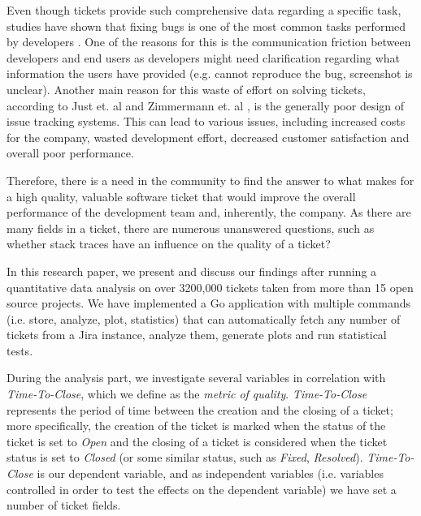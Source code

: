 \documentclass{mpaper}
\begin{document}
Even though tickets provide such comprehensive data regarding a specific task, studies have shown 
that fixing bugs is one of the most common tasks performed by developers \cite{latoza2006maintaining}. One of
the reasons for this is the communication friction between developers and end users \cite{Korkala2014WasteIdentification}
as developers might need clarification regarding what information the users have provided (e.g. cannot reproduce the bug, 
screenshot is unclear). Another main reason for this waste of effort on solving tickets, according to 
Just et. al \cite{just2008towards} and Zimmermann et. al \cite{zimmermann2009improving}, is the generally poor design of issue 
tracking systems. This can lead to various issues, including increased costs for the company, wasted development effort, 
decreased customer satisfaction and overall poor performance.

Therefore, there is a need in the community to find the answer to what makes for a high quality, valuable software ticket 
that would improve the overall performance of the development team and, inherently, the company. As there are many 
fields in a ticket, there are numerous unanswered questions, such as whether stack traces have an influence on the quality
of a ticket? 

In this research paper, we present and discuss our findings after running a quantitative data analysis 
on over 3200,000 tickets taken from more than 15 open source projects. We have implemented a Go application 
with multiple commands (i.e. store, analyze, plot, statistics) that can automatically fetch any number of tickets 
from a Jira instance, analyze them, generate plots and run statistical tests. 

During the analysis part, we investigate several variables in correlation with \emph{Time-To-Close}, 
which we define as the \emph{metric of quality}. \emph{Time-To-Close} represents the period of time between the creation 
and the closing of a ticket; more specifically, the creation of the ticket is marked when the status of the ticket is set to 
\emph{Open} and the closing of a ticket is considered when the ticket status is set to \emph{Closed} (or some similar status, 
such as \emph{Fixed}, \emph{Resolved}). \emph{Time-To-Close} is our dependent variable, and as independent variables 
(i.e. variables controlled in order to test the effects on the dependent variable) we have set a number of ticket fields. 
\end{document}
